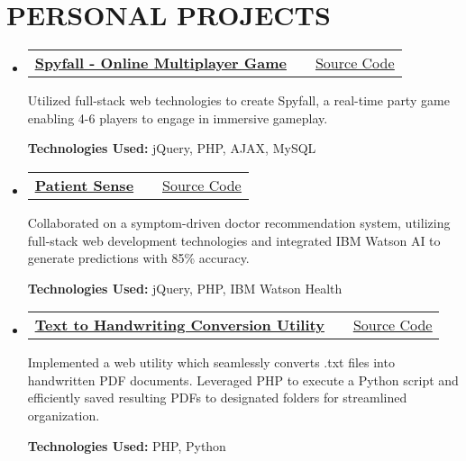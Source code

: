 \documentclass[a4paper,11pt]{article}
\makeatletter
\newcommand{\resumeTrioHeading}[3]{
  \item\small{
    \begin{tabular*}{0.96\textwidth}[t]{
      l@{\extracolsep{\fill}}c@{\extracolsep{\fill}}r
    }
      \textbf{#1} & \textit{#2} & #3
    \end{tabular*}
  }
}
\newcommand{\resumeHeadingListStart}{
  \begin{itemize}[leftmargin=0.15in, label={}]
}
\newcommand{\resumeHeadingListEnd}{\end{itemize}}
\makeatother
\begin{document}

\section{PERSONAL PROJECTS}
  \resumeHeadingListStart{}
    \resumeTrioHeading{\href{https://www.youtube.com/watch?v=f8TswNEPbdw}{\uline{Spyfall - Online Multiplayer Game}}}{}{\href{https://github.com/sayam56/SpyFall}{\uline{Source Code}}}

        {Utilized full-stack web technologies to create Spyfall, a real-time party game enabling 4-6 players to engage in immersive gameplay.}
        
        {\textbf{Technologies Used:} jQuery, PHP, AJAX, MySQL}

      \resumeTrioHeading{\href{https://www.youtube.com/watch?v=E_qBaJ9Mhp8}{\uline{Patient Sense}}}{}{\href{https://github.com/sayam56/Patient_Sense}{\uline{Source Code}}}

      {Collaborated on a symptom-driven doctor recommendation system, utilizing full-stack web development technologies and integrated IBM Watson AI to generate predictions with 85\% accuracy.}
      
      {\textbf{Technologies Used:} jQuery, PHP, IBM Watson Health}


      \resumeTrioHeading{\href{https://www.youtube.com/watch?v=SVvnH6wB_TU}{\uline{Text to Handwriting Conversion Utility}}}{}{\href{https://github.com/sayam56/txtToHandwrittenPDF}{\uline{Source Code}}}

      {Implemented a web utility which seamlessly converts .txt files into handwritten PDF documents. Leveraged PHP to execute a Python script and efficiently saved resulting PDFs to designated folders for streamlined organization.}
      
      {\textbf{Technologies Used:} PHP, Python}
  \resumeHeadingListEnd{}


\end{document}
